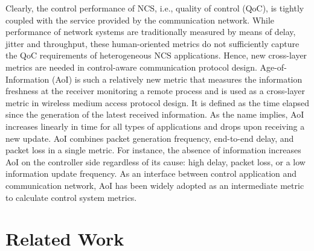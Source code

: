 Clearly, the control performance of NCS, i.e., quality of control (QoC), is
tightly coupled with the service provided by the communication network. While
performance of network systems are traditionally measured by means of delay,
jitter and throughput, these human-oriented metrics do not sufficiently capture
the QoC requirements of heterogeneous NCS applications. Hence, new cross-layer
metrics are needed in control-aware communication protocol design.
Age-of-Information (AoI) is such a relatively new metric that measures the
information freshness at the receiver monitoring a remote process
\cite{kaul2012real} and is used as a cross-layer metric in wireless medium
access protocol design. It is defined as the time elapsed since the generation
of the latest received information. As the name implies, AoI increases linearly
in time for all types of applications and drops upon receiving a new update. AoI
combines packet generation frequency, end-to-end delay, and packet loss in a
single metric. For instance, the absence of information increases AoI on the
controller side regardless of its cause: high delay, packet loss, or a low
information update frequency. As an interface between control application and
communication network, AoI has been widely adopted as an intermediate metric to
calculate control system metrics. 


\section{Related Work} \label{sec:survey}

